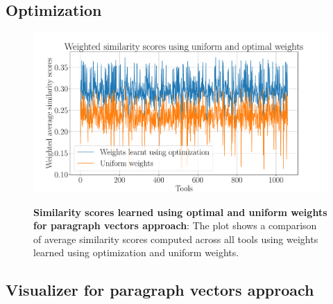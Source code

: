 \subsection{Optimization}
\begin{figure}[h]
\begin{centering}
    {\includegraphics[scale=0.45]{figures/weighted_optimal_uniform_scores.pdf}}
    \caption[Optimal uniform similarity scores]{\textbf{Similarity scores learned using optimal and uniform weights for paragraph vectors approach}: The plot shows a comparison of average similarity scores computed across all tools using weights learned using optimization and uniform weights. }
\end{centering}
\end{figure}


\subsection{Visualizer for paragraph vectors approach}


